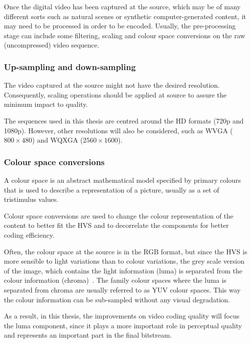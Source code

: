 \documentclass[11pt,a4paper,openright,twoside]{book}
\numberwithin{equation}{section} %
\numberwithin{figure}{section} %
\numberwithin{table}{section} %
\begin{document}
Once the digital video has been captured at the source, which may be of many
different sorts such as natural scenes or synthetic computer-generated
content, it may need to be processed in order to be encoded.
Usually, the pre-processing stage can include some filtering, scaling and
colour space conversions on the raw (uncompressed) video sequence.

\subsubsection{Up-sampling and down-sampling}
\label{ssub:up-sampling_and_down-sampling}

The video captured at the source might not have the desired resolution.
Consequently, scaling operations should be applied at source to assure the
minimum impact to quality.

The sequences used in this thesis are centred around the \ac{HD} formats (720p
and 1080p).
However, other resolutions will also be considered, such as WVGA
($800\times480$) and WQXGA ($2560\times1600$).

\subsubsection{Colour space conversions}
\label{ssub:colour_space_conversions}

A colour space is an abstract mathematical model specified by primary colours
that is used to describe a representation of a picture, usually as a set of
tristimulus values.

Colour space conversions are used to change the colour representation of the
content to better fit the \ac{HVS} and to decorrelate the components for
better coding efficiency.

Often, the colour space at the source is in the \ac{RGB} format, but since the
\ac{HVS} is more sensible to light variations than to colour variations, the
grey scale version of the image, which contains the light information (luma)
is separated from the colour information
(chroma)~\cite{poynton-95-color-space}.
The family colour spaces where the luma is separated from chroma are usually
referred to as YUV colour spaces.
This way the colour information can be sub-sampled without any visual
degradation.

As a result, in this thesis, the improvements on video coding quality will
focus the luma component, since it plays a more important role in perceptual
quality and represents an important part in the final bitstream.
\end{document}
